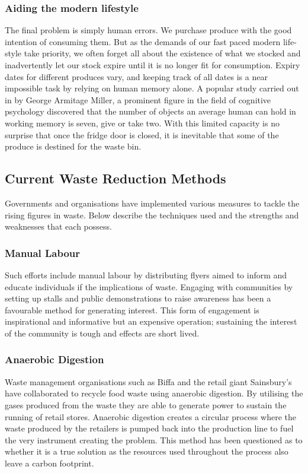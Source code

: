 \documentclass[a4paper, 11pt]{article}
\begin{document}
\subsubsection{Aiding the modern lifestyle}
The final problem is simply human errors. We purchase produce with the good intention of consuming them. But as the demands of our fast paced modern life-style take priority, we often forget all about the existence of what we stocked and inadvertently let our stock expire until it is no longer fit for consumption. Expiry dates for different produces vary, and keeping track of all dates is a near impossible task by relying on human memory alone. A popular study carried out in by George Armitage Miller, a prominent figure in the field of cognitive psychology discovered that the number of objects an average human can hold in working memory is seven, give or take two. With this limited capacity is no surprise that once the fridge door is closed, it is inevitable that some of the produce is destined for the waste bin.


\vspace{\baselineskip}
\vspace{\baselineskip}
\subsection{Current Waste Reduction Methods}
Governments and organisations have implemented various measures to tackle the rising figures in waste. Below describe the techniques used and the strengths and weaknesses that each possess. 

\subsubsection{Manual Labour} 
Such efforts include manual labour by distributing flyers aimed to inform and educate individuals if the implications of waste. Engaging with communities by setting up stalls and public demonstrations to raise awareness has been a favourable method for generating interest. This form of engagement is inspirational and informative but an expensive operation; sustaining the interest of the community is tough and effects are short lived.

\subsubsection{Anaerobic Digestion} 
Waste management organisations such as Biffa and the retail giant Sainsbury's have collaborated to recycle food waste using anaerobic digestion. By utilising the gases produced from the waste they are able to generate power to sustain the running of retail stores. Anaerobic digestion creates a circular process where the waste produced by the retailers is pumped back into the production line to fuel the very instrument creating the problem. This method has been questioned as to whether it is a true solution as the resources used throughout the process also leave a carbon footprint.
\end{document}
